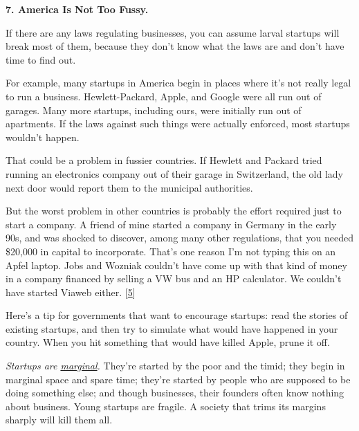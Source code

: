 \textbf{7. America Is Not Too Fussy.}

If there are any laws regulating businesses, you
                  can assume larval startups will break most of them, because
                  they don't know what the laws are and don't have time to find
                  out.

For example, many startups in America begin in
                  places where it's not really legal to run a business.
                  Hewlett-Packard, Apple, and Google were all run out of
                  garages. Many more startups, including ours, were initially
                  run out of apartments. If the laws against such things were
                  actually enforced, most startups wouldn't happen.

That
                  could be a problem in fussier countries. If Hewlett and
                  Packard tried running an electronics company out of their
                  garage in Switzerland, the old lady next door would report
                  them to the municipal authorities.

But the worst
                  problem in other countries is probably the effort required
                  just to start a company. A friend of mine started a company in
                  Germany in the early 90s, and was shocked to discover, among
                  many other regulations, that you needed \$20,000 in capital to
                  incorporate. That's one reason I'm not typing this on an Apfel
                  laptop. Jobs and Wozniak couldn't have come up with that kind
                  of money in a company financed by selling a VW bus and an HP
                  calculator. We couldn't have started Viaweb either.
                  [\href{\#f5n}{5}]

Here's a tip for governments that want to
                  encourage startups: read the stories of existing startups, and
                  then try to simulate what would have happened in your country.
                  When you hit something that would have killed Apple, prune it
                  off.

\emph{Startups are \href{http://www.paulgraham.com/marginal.html}{marginal}.}
                  They're started by the poor and the timid; they begin in
                  marginal space and spare time; they're started by people who
                  are supposed to be doing something else; and though
                  businesses, their founders often know nothing about business.
                  Young startups are fragile. A society that trims its margins
                  sharply will kill them all.

